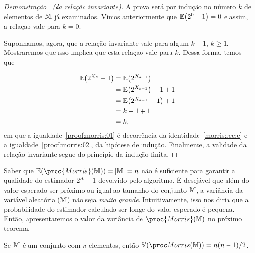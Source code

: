 \begin{proof}[Demonstração \ (da relação invariante)]
  A prova será por indução no número $k$ de elementos de $\mathbb{M}$ já examinados. Vimos anteriormente que 
  $\mathbb{E}\big(2^0 - 1 \big) = 0$ e assim, a relação vale para $k = 0$.

  Suponhamos, agora, que a relação invariante vale para algum $k - 1$, $k \geq 1$. Mostraremos que isso implica que esta
  relação vale para $k$. Dessa forma, temos que

  \begin{align}
      \mathbb{E}\big(2^{X_k} - 1\big) 
      &= \mathbb{E}\big(2^{X_{k-1}}\big)  \label{proof:morris:01}  \\
      &= \mathbb{E}\big(2^{X_{k-1}}\big) - 1 + 1 \nonumber \\
      &= \mathbb{E}\big(2^{X_{k-1}} - 1\big) + 1 \nonumber \\
      &= k - 1 + 1 \label{proof:morris:02} \\ 
      &= k \nonumber,
  \end{align}    
    em que a igualdade~\eqref{proof:morris:01} é decorrência da identidade~\eqref{morris:rec:e} e a 
    igualdade~\eqref{proof:morris:02}, da hipótese de indução. Finalmente, a validade da relação invariante segue do 
    princípio da indução finita.
\end{proof}  

Saber que $\Ebb(\proc{Morris}(\Mbb)) = |\Mbb| = n$ não é suficiente para garantir a qualidade do estimador $2^{X} - 1$
devolvido pelo algoritmo. É desejável que além do valor esperado ser próximo ou igual ao tamanho do conjunto $\mathbb{M}$,
a variância da variável aleatória ($\mathbb{M}$) não seja \textit{muito grande}. Intuitivamente, isso nos diria 
que a probabilidade do estimador calculado ser longe do valor esperado é pequena. Então, apresentaremos o valor da 
variância de $\proc{Morris}(\Mbb)$ no próximo teorema.

\begin{theorem}[da variância]
  \label{morris:theorem:variance}
  Se $\mathbb{M}$ é um conjunto com $n$ elementos, então $\Vbb(\morrisestimator) = n(n - 1) / 2$.
\end{theorem}

